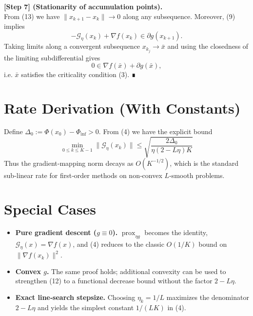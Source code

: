 \documentclass{article}
\newcommand{\prox}{\operatorname{prox}}
\newcommand{\grad}{\nabla}
\begin{document}
\bigskip
\noindent\textbf{[Step 7] (Stationarity of accumulation points).}\\
From (13) we have $\|x_{k+1}-x_k\|\to0$ along any subsequence. Moreover, (9) implies
\[
-\mathcal{G}_\eta(x_k)+\grad f(x_k)\in\partial g(x_{k+1}).
\tag{17}
\]
Taking limits along a convergent subsequence $x_{k_j}\to\bar x$ and using the closedness of the limiting subdifferential gives
\[
0\in\grad f(\bar x)+\partial g(\bar x),
\]
i.e. $\bar x$ satisfies the criticality condition (3). ∎

\section*{Rate Derivation (With Constants)}
Define $\Delta_0:=\Phi(x_0)-\Phi_{\inf}>0$. From (4) we have the explicit bound
\[
\boxed{\;
\min_{0\le k\le K-1}\|\mathcal{G}_\eta(x_k)\|
\le \sqrt{\frac{2\Delta_0}{\eta(2-L\eta)K}}\;
}
\]
Thus the gradient‑mapping norm decays as $O(K^{-1/2})$, which is the standard sub‑linear rate for first‑order methods on non‑convex $L$‑smooth problems.

\section*{Special Cases}
\begin{itemize}
\item \textbf{Pure gradient descent ($g\equiv0$).}  $\prox_{\eta g}$ becomes the identity, $\mathcal{G}_\eta(x)=\grad f(x)$, and (4) reduces to the classic $O(1/K)$ bound on $\|\grad f(x_k)\|^2$.
\item \textbf{Convex $g$.}  The same proof holds; additional convexity can be used to strengthen (12) to a functional decrease bound without the factor $2-L\eta$.
\item \textbf{Exact line‑search stepsize.}  Choosing $\eta_k=1/L$ maximizes the denominator $2-L\eta$ and yields the simplest constant $1/(L K)$ in (4).
\end{itemize}
\end{document}
